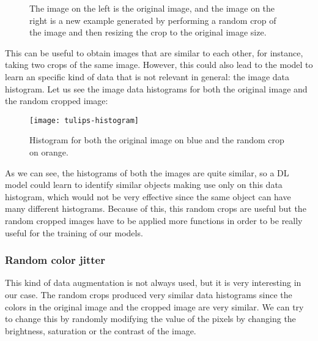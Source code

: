 

\begin{figure}[H] 
    \centering
    \hfill%
        \caption{The image on the left is the original image, and the image on the right is a new example generated by performing a random crop of the image and then resizing the crop to the original image size.}
\end{figure}

This can be useful to obtain images that are similar to each other, for instance, taking two crops of the same image. However, this could also lead to the model to learn an specific kind of data that is not relevant in general: the image data histogram. Let us see the image data histograms for both the original image and the random cropped image:

\begin{figure}[H] 
    \centering
    \texttt{[image: tulips-histogram]}%
        \label{fig:hist:orig:cropped}%
        \caption{Histogram for both the original image on blue and the random crop on orange.}
\end{figure}

As we can see, the histograms of both the images are quite similar, so a DL model could learn to identify similar objects making use only on this data histogram, which would not be very effective since the same object can have many different histograms. Because of this, this random crops are useful but the random cropped images have to be applied more functions in order to be really useful for the training of our models. 


\subsubsection*{Random color jitter}

This kind of data augmentation is not always used, but it is very interesting in our case. The random crops produced very similar data histograms since the colors in the original image and the cropped image are very similar. We can try to change this by randomly modifying the value of the pixels by changing the brightness, saturation or the contrast of the image.


